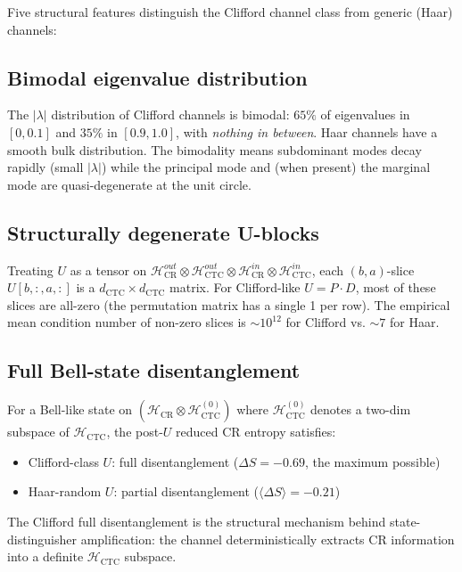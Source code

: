\documentclass[11pt,a4paper]{article}
\begin{document}
Five structural features distinguish the Clifford channel class
from generic (Haar) channels:

\subsection{Bimodal eigenvalue distribution}

The $|\lambda|$ distribution of Clifford channels is bimodal: $65\%$
of eigenvalues in $[0, 0.1]$ and $35\%$ in $[0.9, 1.0]$, with
\emph{nothing in between}. Haar channels have a smooth bulk
distribution. The bimodality means subdominant modes decay rapidly
(small $|\lambda|$) while the principal mode and (when present) the
marginal mode are quasi-degenerate at the unit circle.

\subsection{Structurally degenerate U-blocks}

Treating $U$ as a tensor on
$\mathcal{H}_{\text{CR}}^{out} \otimes \mathcal{H}_{\text{CTC}}^{out}
\otimes \mathcal{H}_{\text{CR}}^{in} \otimes \mathcal{H}_{\text{CTC}}^{in}$,
each $(b, a)$-slice $U[b, :, a, :]$ is a $d_{\text{CTC}} \times d_{\text{CTC}}$
matrix. For Clifford-like $U = P \cdot D$, most of these slices are
all-zero (the permutation matrix has a single 1 per row). The
empirical mean condition number of non-zero slices is $\sim 10^{12}$
for Clifford vs. $\sim 7$ for Haar.

\subsection{Full Bell-state disentanglement}

For a Bell-like state on $(\mathcal{H}_{\text{CR}} \otimes \mathcal{H}_{\text{CTC}}^{(0)})$
where $\mathcal{H}_{\text{CTC}}^{(0)}$ denotes a two-dim subspace
of $\mathcal{H}_{\text{CTC}}$, the post-$U$ reduced CR entropy
satisfies:
\begin{itemize}
\item Clifford-class $U$: full disentanglement ($\Delta S = -0.69$,
the maximum possible)
\item Haar-random $U$: partial disentanglement ($\langle \Delta S \rangle = -0.21$)
\end{itemize}
The Clifford full disentanglement is the structural mechanism
behind state-distinguisher amplification: the channel
deterministically extracts CR information into a definite
$\mathcal{H}_{\text{CTC}}$ subspace.
\end{document}
